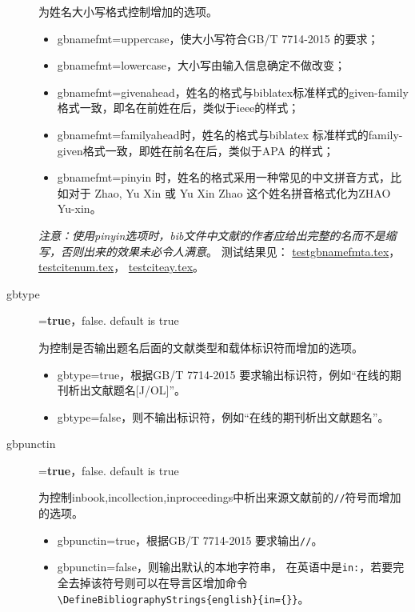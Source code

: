 \begin{description}
  为姓名大小写格式控制增加的选项。
  \begin{itemize}
    \item gbnamefmt=uppercase，使大小写符合GB/T 7714-2015 的要求；
    \item gbnamefmt=lowercase，大小写由输入信息确定不做改变；
    \item gbnamefmt=givenahead，姓名的格式与biblatex标准样式的given-family格式一致，即名在前姓在后，类似于ieee的样式；
    \item gbnamefmt=familyahead时，姓名的格式与biblatex 标准样式的family-given格式一致，即姓在前名在后，类似于APA 的样式；
    \item gbnamefmt=pinyin 时，姓名的格式采用一种常见的中文拼音方式，比如对于 Zhao, Yu Xin 或 Yu Xin Zhao 这个姓名拼音格式化为ZHAO Yu-xin。
  \end{itemize}
  \par
  \emph{注意：使用pinyin选项时，bib文件中文献的作者应给出完整的名而不是缩写，否则出来的效果未必令人满意}。
  测试结果见：
  \href{run:./example/testgbnamefmt.tex}{testgbnamefmta.tex}，
  \href{run:./example/testcitenum.tex}{testcitenum.tex}，
  \href{run:./example/testciteay.tex}{testciteay.tex}。


  \item[gbtype]=\textbf{true}，false. \hfill default is true

  为控制是否输出题名后面的文献类型和载体标识符而增加的选项。
  \begin{itemize}
    \item gbtype=true，根据GB/T 7714-2015 要求输出标识符，例如“在线的期刊析出文献题名[J/OL]”。
    \item gbtype=false，则不输出标识符，例如“在线的期刊析出文献题名”。
  \end{itemize}



  \item[gbpunctin]=\textbf{true}，false. \hfill default is true

  为控制inbook,incollection,inproceedings中析出来源文献前的\texttt{//}符号而增加的选项。
  \begin{itemize}
    \item gbpunctin=true，根据GB/T 7714-2015 要求输出\texttt{//}。
    \item gbpunctin=false，则输出默认的本地字符串，
    在英语中是\texttt{in:}，若要完全去掉该符号则可以在导言区增加命令
  \lstinline!\DefineBibliographyStrings{english}{in={}}!。
  \end{itemize}




\end{description}
